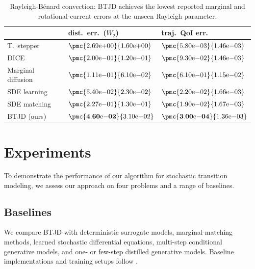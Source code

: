 \documentclass[oneside,11pt]{article}
\theoremstyle{remark}
\begin{document}
\begin{table}[t]
\centering\small
\caption{Rayleigh-B\'{e}nard convection: BTJD achieves the lowest reported marginal and rotational-current errors at the unseen Rayleigh parameter.}
\label{tab:rb_convection}
\begin{tabular}{lll}
\toprule
 & dist.\ err.\ ($W_2$) & traj.\ QoI err.\ \\
\midrule
T.\ stepper \cite{otness2021an}
& $\pmc{2.69\mathrm{e}{+00}}{1.60\mathrm{e}{+00}}$
& $\pmc{5.80\mathrm{e}{-03}}{1.46\mathrm{e}{-03}}$ \\
DICE \cite{blickhan-berman-stuart-etal:2025}
& $\pmc{2.00\mathrm{e}{-01}}{1.20\mathrm{e}{-01}}$
& $\pmc{9.30\mathrm{e}{-02}}{1.46\mathrm{e}{-03}}$ \\
Marginal diffusion \cite{ho2020denoising}
& $\pmc{1.11\mathrm{e}{-01}}{6.10\mathrm{e}{-02}}$
& $\pmc{6.10\mathrm{e}{-01}}{1.15\mathrm{e}{-02}}$ \\
SDE learning \cite{dridi2021learning}
& $\pmc{5.40\mathrm{e}{-02}}{2.30\mathrm{e}{-02}}$
& $\pmc{2.20\mathrm{e}{-02}}{1.66\mathrm{e}{-03}}$ \\
SDE matching \cite{bartosh2025sdematching}
& $\pmc{2.27\mathrm{e}{-01}}{1.30\mathrm{e}{-01}}$
& $\pmc{1.90\mathrm{e}{-02}}{1.67\mathrm{e}{-03}}$ \\
BTJD (ours)
& $\pmc{\mathbf{4.60\mathrm{e}{-02}}}{3.10\mathrm{e}{-02}}$
& $\pmc{\mathbf{3.00\mathrm{e}{-04}}}{1.36\mathrm{e}{-03}}$ \\
\bottomrule
\end{tabular}%
\end{table}

\section{Experiments}
To demonstrate the performance of our algorithm for stochastic transition modeling, we assess our approach on four problems and a range of baselines.

\subsection{Baselines}
\label{sec:baselines}

We compare BTJD with deterministic surrogate models, marginal-matching methods,
learned stochastic differential equations, multi-step conditional generative models,
and one- or few-step distilled generative models. Baseline
implementations and training setups follow \cite{jha2026firstordertrajectorymatchingfast}.
\end{document}
